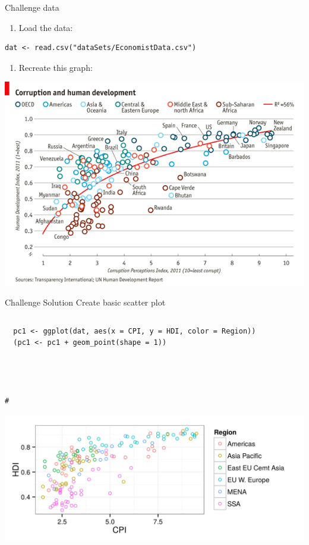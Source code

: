 \documentclass[table,smaller]{beamer}
\begin{document}
\begin{frame}[fragile,label=sec-8-2]{Challenge data}
 \begin{enumerate}
\item Load the data:
\end{enumerate}
\begin{verbatim}
dat <- read.csv("dataSets/EconomistData.csv")
\end{verbatim}

\begin{enumerate}
\item Recreate this graph:
\end{enumerate}
\includegraphics[width=.9\linewidth]{images/Economist1.png}
\end{frame}

\begin{frame}[fragile,label=sec-8-3]{Challenge Solution}
 Create basic scatter plot

\begin{columns}  \begin{block}{}

\begin{verbatim}
  pc1 <- ggplot(dat, aes(x = CPI, y = HDI, color = Region))
  (pc1 <- pc1 + geom_point(shape = 1))




#
\end{verbatim}

\includegraphics[width=.9\linewidth]{images/econScatter1.png}

\end{block} \end{columns}
\end{frame}
\end{document}
